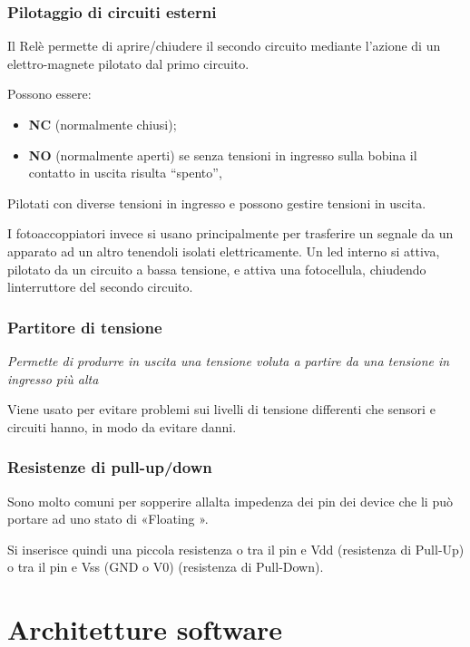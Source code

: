 \subsubsection{Pilotaggio di circuiti
esterni}\label{pilotaggio-di-circuiti-esterni}

Il Relè permette di aprire/chiudere il secondo circuito mediante
l'azione di un elettro-magnete pilotato dal primo circuito.

Possono essere:

\begin{itemize}
\item
  \textbf{NC} (normalmente chiusi);
\item
  \textbf{NO} (normalmente aperti) se senza tensioni in ingresso sulla
  bobina il contatto in uscita risulta ``spento'',
\end{itemize}

Pilotati con diverse tensioni in ingresso e possono gestire tensioni in
uscita.

I fotoaccoppiatori invece si usano principalmente per trasferire un
segnale da un apparato ad un altro tenendoli isolati elettricamente. Un
led interno si attiva, pilotato da un circuito a bassa tensione, e
attiva una fotocellula, chiudendo l\textquotesingle interruttore del
secondo circuito.

\subsubsection{Partitore di tensione}\label{partitore-di-tensione}

\emph{Permette di produrre in uscita una tensione voluta a partire da
una tensione in ingresso più alta}

Viene usato per evitare problemi sui livelli di tensione differenti che
sensori e circuiti hanno, in modo da evitare danni.

\subsubsection{Resistenze di
pull-up/down}\label{resistenze-di-pull-updown}

Sono molto comuni per sopperire all\textquotesingle alta impedenza dei
pin dei device che li può portare ad uno stato di «Floating ».

Si inserisce quindi una piccola resistenza o tra il pin e Vdd
(resistenza di Pull-Up) o tra il pin e Vss (GND o V0) (resistenza di
Pull-Down).

\section{Architetture software}\label{architetture-software}

